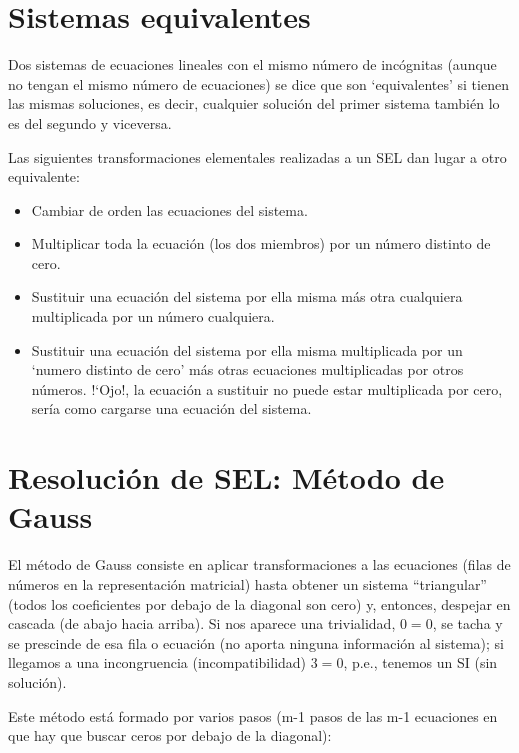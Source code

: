 \section{Sistemas equivalentes}
\begin{defi}
Dos sistemas de ecuaciones lineales con el mismo número de incógnitas (aunque no tengan el mismo número de ecuaciones) se dice que son `equivalentes' si tienen las mismas soluciones, es decir, cualquier solución del primer sistema también lo es del segundo y viceversa.	
\end{defi}
\begin{teor}
Las siguientes transformaciones elementales realizadas a un SEL dan lugar a otro equivalente:

\begin{itemize}
\item Cambiar de orden las ecuaciones del sistema.
\item Multiplicar toda la ecuación (los dos miembros) por un número distinto de cero.
\item Sustituir una ecuación del sistema por ella misma más otra cualquiera multiplicada por un número cualquiera.
\item Sustituir una ecuación del sistema por ella misma multiplicada por un `numero distinto de cero' más otras ecuaciones multiplicadas por otros números. \textcolor{gris}{!`Ojo!, la ecuación a sustituir no puede estar multiplicada por cero, sería como cargarse una ecuación del sistema.}	
\end{itemize}
	
\end{teor}


\section[Resolución de SEL: Método de Gauss]{Resolución de SEL: Método de Gauss}


El método de Gauss consiste en aplicar transformaciones a las ecuaciones (filas de números en la representación matricial) hasta obtener un sistema “triangular” (todos los coeficientes por debajo de la diagonal son cero) y, entonces, despejar en cascada (de abajo hacia arriba). Si nos aparece una trivialidad, $0=0$, se tacha y se prescinde de esa fila o ecuación (no aporta ninguna información al sistema); si llegamos a una incongruencia (incompatibilidad) $3=0$, p.e., tenemos un SI (sin solución). 

Este método está formado por varios pasos (m-1 pasos de las m-1 ecuaciones en que hay que buscar ceros por debajo de la diagonal): 

